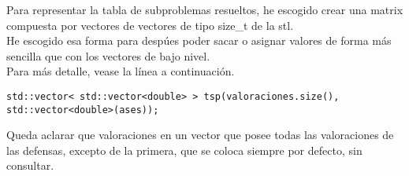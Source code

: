 Para representar la tabla de subproblemas resueltos, he escogido crear
una matrix compuesta por vectores de vectores de tipo size_t de la stl.\\

He escogido esa forma para despúes poder sacar o asignar valores de forma
más sencilla que con los vectores de bajo nivel.\\

Para más detalle, vease la línea a continuación.\\

\begin{lstlisting}
std::vector< std::vector<double> > tsp(valoraciones.size(), std::vector<double>(ases));
\end{lstlisting}

Queda aclarar que valoraciones en un vector que posee todas las valoraciones de las defensas,
excepto de la primera, que se coloca siempre por defecto, sin consultar.\\
